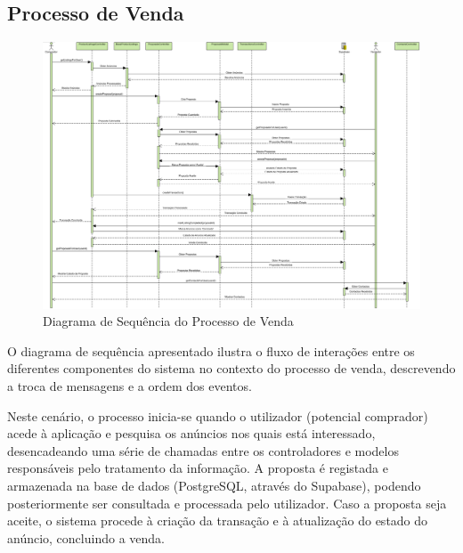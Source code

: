 \documentclass[a4paper, 12pt]{article} %
\begin{document}
\subsection{Processo de Venda}
\begin{figure}[ht]
	\centering
	\includegraphics[width=\textwidth]{../images/sequence-diagram-sale.png}
	\caption{Diagrama de Sequência do Processo de Venda}
	\label{fig:diagrama_sequencia_venda}
\end{figure}

O diagrama de sequência apresentado ilustra o fluxo de interações entre os diferentes componentes do sistema no contexto do processo de venda, descrevendo a troca de mensagens e a ordem dos eventos.

Neste cenário, o processo inicia-se quando o utilizador (potencial comprador) acede à aplicação e pesquisa os anúncios nos quais está interessado, desencadeando uma série de chamadas entre os controladores e modelos responsáveis pelo tratamento da informação. A proposta é registada e armazenada na base de dados (PostgreSQL, através do Supabase), podendo posteriormente ser consultada e processada pelo utilizador. Caso a proposta seja aceite, o sistema procede à criação da transação e à atualização do estado do anúncio, concluindo a venda.
\end{document}
